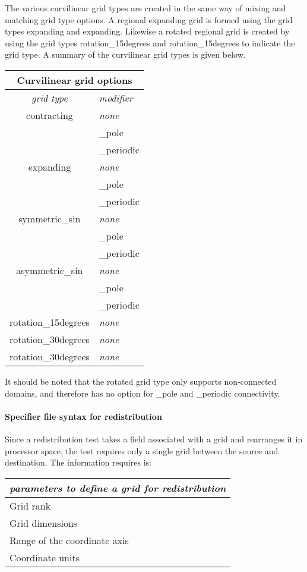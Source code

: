 The various curvilinear grid types are created in the same way of mixing and matching grid type options. A regional expanding grid is formed using the grid types expanding and expanding. Likewise a rotated regional grid is created by
using the grid types rotation\_15degrees and rotation\_15degrees to indicate the grid type. A summary of the curvilinear grid types is given below. 
\begin{center}
\begin{tabular}{| c | l |} 
\multicolumn{2}{c}{Curvilinear grid options}  \\
\hline
{\em grid type } & {\em modifier} \\
\hline \hline
 contracting & {\em none} \\ 
                    &   \_pole       \\
                    &   \_periodic  \\
 \hline                   
 expanding  & {\em none} \\ 
                    &   \_pole       \\
                    &   \_periodic  \\
\hline
symmetric\_sin & {\em none} \\ 
                    &   \_pole       \\
                    &   \_periodic  \\
\hline
asymmetric\_sin & {\em none} \\ 
                    &   \_pole       \\
                    &   \_periodic  \\
\hline
rotation\_15degrees & {\em none} \\ 
\hline
rotation\_30degrees & {\em none} \\ 
\hline
rotation\_30degrees & {\em none} \\ 
\hline 
\end{tabular}
\end{center}
It should be noted that the rotated grid type only supports non-connected domains, and therefore has no option for \_pole and \_periodic connectivity.


\paragraph{Specifier file syntax for redistribution}
Since a redistribution test takes a field associated with a grid and rearranges it in processor space, the test requires only a single grid between the source and destination. The information requires is:
\begin{center}
\begin{tabular}{| l |} \hline 
{\em parameters to define a grid for redistribution }  \\
\hline \hline
 Grid rank    \\
 Grid dimensions   \\
 Range of the coordinate axis  \\
 Coordinate units \\
\hline 
\end{tabular}
\end{center}

